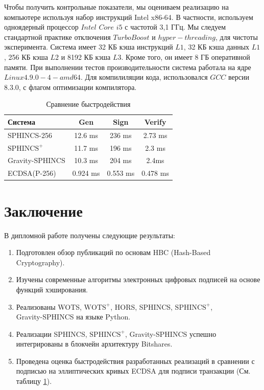 \documentclass[a4paper, 14pt]{extarticle}
\begin{document}
Чтобы получить контрольные показатели, мы оцениваем реализацию на компьютере используя набор инструкций Intel x86-64. В частности, используем одноядерный процессор $Intel$ $Core$ $i5$ с частотой 3,1 ГГц. Мы следуем стандартной практике отключения $TurboBoost$ и $hyper-threading$, для чистоты эксперимента. Система имеет 32 КБ кэша инструкций $L1$, 32 КБ кэша данных $L1$, 256 КБ кэша $L2$ и 8192 КБ кэша $L3$. Кроме того, он имеет 8 ГБ оперативной памяти. При выполнении тестов производительности система работала на ядре $Linux 4.9.0-4-amd64$. Для компилиляции кода, использовался $GCC$ версии 8.3.0, с флагом оптимизации компилятора.
\newline

\begin{table}[h!]
    \begin{center}
      \caption{Сравнение быстродействия}
      \label{tab:table1}
      \begin{tabular}{l|c|c|c}
        \textbf{Система} & \textbf{Gen} & \textbf{Sign} & \textbf{Verify}\\
        \hline
        SPHINCS-256 & 12.6 ms & 236 ms & 2.73 ms\\
        $\text{SPHINCS}^+$ & 11.7 ms & 196 ms & 2.3 ms\\
        Gravity-SPHINCS & 10.3 ms & 204 ms & 2.4ms\\
        ECDSA(P-256) & 0.924 ms & 0.553 ms & 0.478 ms\\
      \end{tabular}
    \end{center}
  \end{table}
\newpage

\section{Заключение}
В дипломной работе получены следующие результаты:
\begin{enumerate}
    \item Подготовлен обзор публикаций по основам HBC (Hash-Based\\ Cryptography).
    \item Изучены современные алгоритмы электронных цифровых подписей на основе функций хэширования.
    \item Реализованы WOTS, $\text{WOTS}^+$, HORS, SPHINCS, $\text{SPHINCS}^+$, \\Gravity-SPHINCS на языке Python.
    \item Реализации SPHINCS, $\text{SPHINCS}^+$, Gravity-SPHINCS успешно интегрированы в блокчейн архитектуру Bitshares.
    \item Проведена оценка быстродействия разработанных реализаций в сравнении с подписью на эллиптических кривых ECDSA для подписи транзакции (См. таблицу \ref{tab:table1}).
\end{enumerate}
\end{document}
